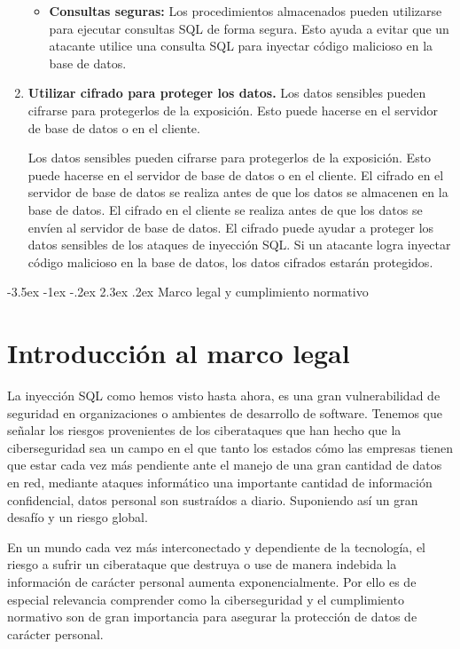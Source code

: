 \documentclass[11pt]{report}
\makeatletter
\renewcommand\chapter{\@startsection{chapter}{0}{\z@}%
    {-3.5ex \@plus -1ex \@minus -.2ex}%
    {2.3ex \@plus.2ex}%
    {\normalfont\Large\bfseries}}
\makeatother
\begin{document}
\begin{enumerate}
\begin{itemize}
    \item \textbf{Consultas seguras:} Los procedimientos almacenados pueden utilizarse para ejecutar consultas SQL de forma segura. Esto
    ayuda a evitar que un atacante utilice una consulta SQL para inyectar código malicioso en la base de datos.
  \end{itemize}

  \item \textbf{Utilizar cifrado para proteger los datos.} Los datos sensibles pueden cifrarse para protegerlos de la exposición. Esto puede
  hacerse en el servidor de base de datos o en el cliente.

  Los datos sensibles pueden cifrarse para protegerlos de la exposición. Esto puede hacerse en el servidor de base de datos o en el cliente.
  El cifrado en el servidor de base de datos se realiza antes de que los datos se almacenen en la base de datos. El cifrado en el cliente se
  realiza antes de que los datos se envíen al servidor de base de datos. El cifrado puede ayudar a proteger los datos sensibles de los ataques
  de inyección SQL. Si un atacante logra inyectar código malicioso en la base de datos, los datos cifrados estarán protegidos.
\end{enumerate}

\chapter{Marco legal y cumplimiento normativo}
\section{Introducción al marco legal}
La inyección SQL como hemos visto hasta ahora, es una gran vulnerabilidad de seguridad en organizaciones o ambientes de desarrollo de software. 
Tenemos que señalar los riesgos provenientes de los ciberataques que han hecho que  la ciberseguridad sea un campo en el que tanto los estados 
cómo las empresas tienen que estar cada vez más pendiente ante el manejo de una gran cantidad de datos en red, mediante ataques informático una
importante cantidad de información confidencial, datos personal son sustraídos a diario. Suponiendo así un gran desafío y un riesgo global.

En un mundo cada vez más interconectado y dependiente de la tecnología, el riesgo a sufrir un ciberataque que destruya o use de manera indebida
la información de carácter personal aumenta exponencialmente. Por ello es de especial relevancia comprender como la ciberseguridad y el cumplimiento
normativo son de gran importancia para asegurar la protección de datos de carácter personal.
\end{document}
